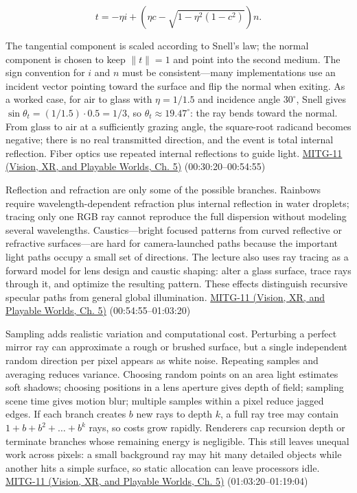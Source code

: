 \[
t=-\eta i+\left(\eta c-\sqrt{1-\eta^2(1-c^2)}\right)n.
\]

The tangential component is scaled according to Snell's law; the normal component is chosen to keep \(\|t\|=1\) and point into the second medium. The sign convention for \(i\) and \(n\) must be consistent---many implementations use an incident vector pointing toward the surface and flip the normal when exiting. As a worked case, for air to glass with \(\eta=1/1.5\) and incidence angle \(30^\circ\), Snell gives \(\sin\theta_t=(1/1.5)\cdot0.5=1/3\), so \(\theta_t\approx19.47^\circ\): the ray bends toward the normal. From glass to air at a sufficiently grazing angle, the square-root radicand becomes negative; there is no real transmitted direction, and the event is total internal reflection. Fiber optics use repeated internal reflections to guide light. \href{../07-Vision-XR-and-Playable-Worlds/main.pdf\#nameddest=04-visual-computing-ii-ch036-mitg-11---ray-tracing}{MITG-11 (Vision, XR, and Playable Worlds, Ch. 5)} (00:30:20--00:54:55)

Reflection and refraction are only some of the possible branches. Rainbows require wavelength-dependent refraction plus internal reflection in water droplets; tracing only one RGB ray cannot reproduce the full dispersion without modeling several wavelengths. Caustics---bright focused patterns from curved reflective or refractive surfaces---are hard for camera-launched paths because the important light paths occupy a small set of directions. The lecture also uses ray tracing as a forward model for lens design and caustic shaping: alter a glass surface, trace rays through it, and optimize the resulting pattern. These effects distinguish recursive specular paths from general global illumination. \href{../07-Vision-XR-and-Playable-Worlds/main.pdf\#nameddest=04-visual-computing-ii-ch036-mitg-11---ray-tracing}{MITG-11 (Vision, XR, and Playable Worlds, Ch. 5)} (00:54:55--01:03:20)

Sampling adds realistic variation and computational cost. Perturbing a perfect mirror ray can approximate a rough or brushed surface, but a single independent random direction per pixel appears as white noise. Repeating samples and averaging reduces variance. Choosing random points on an area light estimates soft shadows; choosing positions in a lens aperture gives depth of field; sampling scene time gives motion blur; multiple samples within a pixel reduce jagged edges. If each branch creates \(b\) new rays to depth \(k\), a full ray tree may contain \(1+b+b^2+\dots+b^k\) rays, so costs grow rapidly. Renderers cap recursion depth or terminate branches whose remaining energy is negligible. This still leaves unequal work across pixels: a small background ray may hit many detailed objects while another hits a simple surface, so static allocation can leave processors idle. \href{../07-Vision-XR-and-Playable-Worlds/main.pdf\#nameddest=04-visual-computing-ii-ch036-mitg-11---ray-tracing}{MITG-11 (Vision, XR, and Playable Worlds, Ch. 5)} (01:03:20--01:19:04)

